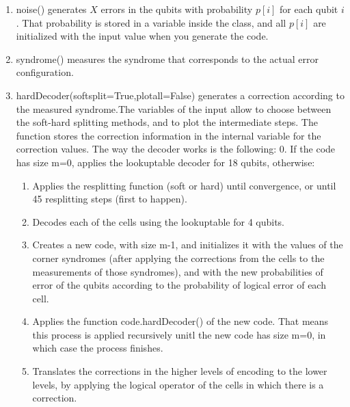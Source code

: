 \documentclass[a4paper,12pt]{article}
\begin{document}
\begin{enumerate}
\item noise() generates $X$ errors in the qubits with probability $p[i]$ for each qubit $i$. That probability is stored in a variable inside the class, and all $p[i]$ are initialized with the input value when you generate the code.

\item syndrome() measures the syndrome that corresponds to the actual error configuration.

\item  hardDecoder(softsplit=True,plotall=False) generates a correction according to the measured syndrome.The variables of the input allow to choose between the soft-hard splitting methods, and to plot the intermediate steps. The function stores the correction information in the internal variable for the correction values. The way the decoder works is the following: 0. If the code has size m=0, applies the lookuptable decoder for 18 qubits, otherwise:
\begin{enumerate}
\item  Applies the resplitting function (soft or hard) until convergence, or until 45 resplitting steps (first to happen).
  \item  Decodes each of the cells using the lookuptable for 4 qubits.
  \item  Creates a new code, with size m-1, and initializes it with the values of the corner syndromes (after applying the
    corrections from the cells to the measurements of those syndromes), and with the new probabilities of error 
    of the qubits according to the probability of logical error of each cell.


\item     Applies the function code.hardDecoder() of the new code. That means this process is applied recursively unitl the
    new code has size m=0, in which case the process finishes.
\item     Translates the corrections in the higher levels of encoding to the lower levels, by applying the logical operator
    of the cells in which there is a correction.
\end{enumerate}


\end{enumerate}
\end{document}
